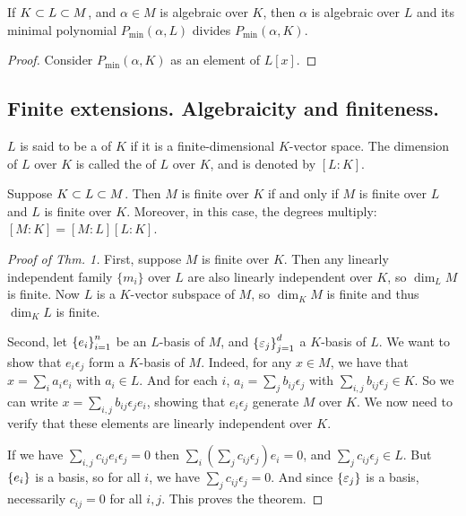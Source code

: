 \begin{prop}
If $K \subset L \subset M$, and $\alpha \in M$ is algebraic over $K$, then $\alpha$ is algebraic over $L$ and its minimal polynomial $P_{\min}(\alpha, L)$ divides $P_{\min}(\alpha, K)$.
\begin{proof}
Consider $P_{\min}(\alpha, K)$ as an element of $L[x]$.
\end{proof}
\end{prop}

\subsection{Finite extensions. Algebraicity and finiteness.}
\begin{dfn}
$L$ is said to be a  of $K$ if it is a finite-dimensional $K$-vector space. The dimension of $L$ over $K$ is called the  of $L$ over $K$, and is denoted by $[L:K]$. 
\end{dfn}
\begin{thm}
Suppose $K \subset L \subset M$. Then $M$ is finite over $K$ if and only if $M$ is finite over $L$ and $L$ is finite over $K$. Moreover, in this case, the degrees multiply: $[M:K] = [M:L][L:K]$.
\end{thm}
\begin{proof}[Proof of Thm. 1]
First, suppose $M$ is finite over $K$. Then any linearly independent family $\{m_i\}$ over $L$ are also linearly independent over $K$, so $\dim_L M$ is finite. Now $L$ is a $K$-vector subspace of $M$, so $\dim_K M$ is finite and thus $\dim_K L$ is finite.

Second, let $\left\{e_i\right\}_{i = 1}^{n}$ be an $L$-basis of $M$, and $\left\{\varepsilon_j\right\}_{j = 1}^{d}$ a $K$-basis of $L$. We want to show that $e_i \epsilon_j$ form a $K$-basis of $M$. Indeed, for any $x \in M$, we have that $x = \sum_{i} a_i e_i$ with $a_i \in L$. And for each $i$, $a_i = \sum_{j} b_{ij} \epsilon_j$ with $\sum_{i,j} b_{ij}\epsilon_j \in K$. So we can write $x = \sum_{i,j} b_{ij} \epsilon_j e_i$, showing that $e_i \epsilon_j$ generate $M$ over $K$. We now need to verify that these elements are linearly independent over $K$.

If we have $\sum_{i,j} c_{ij} e_i \epsilon_j = 0$ then $\sum_{i} \left(\sum_{j} c_{ij} \epsilon_j\right) e_i = 0$, and $\sum_{j} c_{ij} \epsilon_j \in L$. But $\left\{e_i\right\}$ is a basis, so for all $i$, we have $\sum_{j} c_{ij} \epsilon_j = 0$. And since $\left\{\varepsilon_j\right\}$ is a basis, necessarily $c_{ij} = 0$ for all $i, j$. This proves the theorem.
\end{proof}

